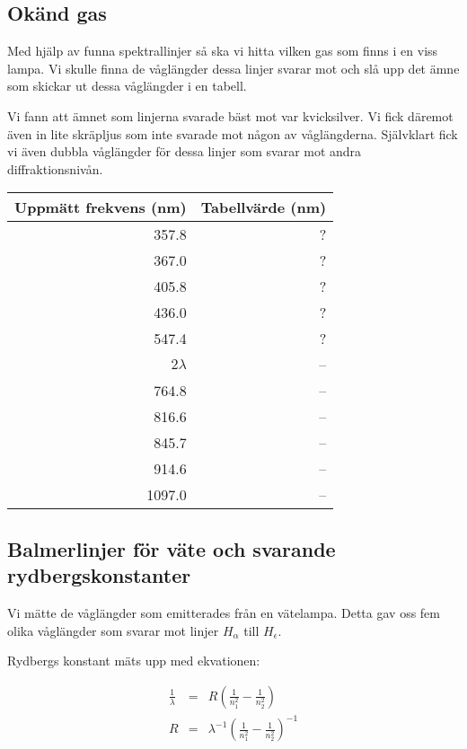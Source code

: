 \documentclass[a4paper,10pt]{article}
\begin{document}
\subsection{Okänd gas}

Med hjälp av funna spektrallinjer så ska vi hitta vilken gas som finns i en viss lampa. Vi skulle finna de våglängder dessa linjer svarar mot och slå upp det ämne som skickar ut dessa våglängder i en tabell.

Vi fann att ämnet som linjerna svarade bäst mot var kvicksilver. Vi fick däremot även in lite skräpljus som inte svarade mot någon av våglängderna. Självklart fick vi även dubbla våglängder för dessa linjer som svarar mot andra diffraktionsnivån.

\begin{center}
\begin{tabular}[c]{|r|r|}
	\hline
	Uppmätt frekvens (nm) & Tabellvärde (nm) \\
	\hline
	357.8 & ? \\
	367.0 & ? \\
	405.8 & ? \\
	436.0 & ? \\
	547.4 & ? \\
	$2\lambda$ & -- \\
	764.8 & -- \\
	816.6 & -- \\
	845.7 & -- \\
	914.6 & -- \\
	1097.0 & -- \\
	\hline
\end{tabular}
\end{center}

\subsection{Balmerlinjer för väte och svarande rydbergskonstanter}

Vi mätte de våglängder som emitterades från en vätelampa. Detta gav oss fem olika våglängder som svarar mot linjer $H_\alpha$ till $H_\epsilon$.

Rydbergs konstant mäts upp med ekvationen:

\begin{eqnarray*}
\frac{1}{\lambda} &=& R\left(\frac{1}{n^2_1} - \frac{1}{n^2_2}\right) \\
R &=& \lambda^{-1}\left(\frac{1}{n_1^2} - \frac{1}{n_2^2} \right)^{-1}
\end{eqnarray*}
\end{document}
